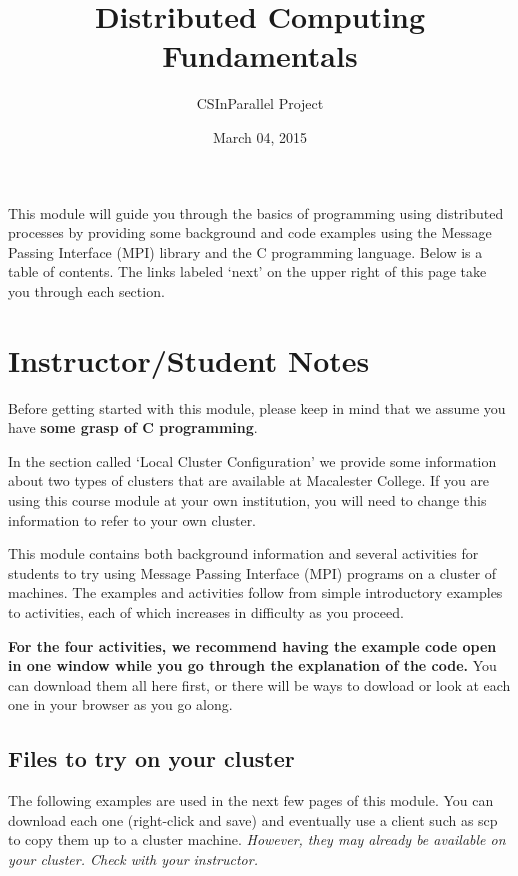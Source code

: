 \documentclass[letterpaper,10pt,openany,oneside]{sphinxmanual}
\title{Distributed Computing Fundamentals}
\date{March 04, 2015}
\author{CSInParallel Project}
\begin{document}
\maketitle
\tableofcontents
{}\label{index::doc}


This module will guide you through the basics of programming using distributed processes
by providing some background and code examples using the Message Passing Interface (MPI)
library and the C programming language. Below is a table of contents. The links labeled `next'
on the upper right of this page take you through each section.


\chapter{Instructor/Student Notes}
\label{Prerequisites/Prerequisites:distributed-computing-fundamentals}\label{Prerequisites/Prerequisites:instructor-student-notes}\label{Prerequisites/Prerequisites::doc}
Before getting started with this module, please keep in mind that we assume you have \textbf{some grasp of C programming}.

In the section called `Local Cluster Configuration' we provide some information about two types of clusters that are available at Macalester College.  If you are using this course module at your own institution, you will need to change this information to refer to your own cluster.

This module contains both background information and several activities for students to try using Message Passing Interface (MPI) programs on a cluster
of machines.  The examples and activities follow from simple introductory examples to activities, each of which increases in difficulty as you proceed.

\textbf{For the four activities, we recommend having the example code open in one window while you go through the explanation of the code.}  You can download them all here first, or there will be ways to dowload or look at each one in your browser as you go along.


\section{Files to try on your cluster}
\label{Prerequisites/Prerequisites:files-to-try-on-your-cluster}
The following examples are used in the next few pages of this module.  You can download each one (right-click and save) and eventually use a client such as scp to copy them up to a cluster machine.  \emph{However, they may already be available on your cluster. Check with your instructor.}
\end{document}
